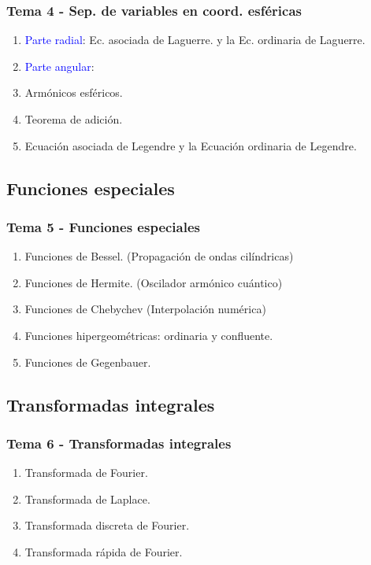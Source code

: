 \documentclass[12pt]{beamer}
\begin{document}
\begin{frame}
\frametitle{Tema 4 - Sep. de variables en coord. esféricas}
\begin{enumerate}[<+->]
\item \textcolor{blue}{Parte radial}: Ec. asociada de Laguerre. y la Ec. ordinaria de Laguerre.
\item \textcolor{blue}{Parte angular}:
\item Armónicos esféricos.
\item Teorema de adición.
\item Ecuación asociada de Legendre y la Ecuación ordinaria de Legendre.
\end{enumerate}
\end{frame}

\subsection{Funciones especiales}

\begin{frame}
\frametitle{Tema 5 - Funciones especiales}
\begin{enumerate}[<+->]
\item Funciones de Bessel. (Propagación de ondas cilíndricas)
\item Funciones de Hermite. (Oscilador armónico cuántico)
\item Funciones de Chebychev (Interpolación numérica)
\item Funciones hipergeométricas: ordinaria y confluente.
\item Funciones de Gegenbauer.
\end{enumerate}
\end{frame}

\subsection{Transformadas integrales}
\begin{frame}
\frametitle{Tema 6 - Transformadas integrales}
\begin{enumerate}[<+->]
\item Transformada de Fourier.
\item Transformada de Laplace.
\item Transformada discreta de Fourier.
\item Transformada rápida de Fourier.
\end{enumerate}
\end{frame}
 
\end{document}
